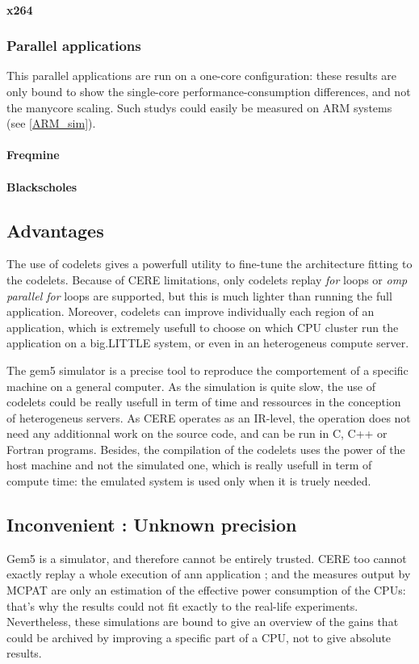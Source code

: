 \documentclass{article}
\begin{document}
\begin{multicols}{2}
\paragraph{x264}

\subsubsection{Parallel applications}
This parallel applications are run on a one-core configuration: these results are only bound to show the single-core performance-consumption differences, and not the manycore scaling. Such studys could easily be measured on ARM systems (see \ref{ARM_sim}).

\paragraph{Freqmine}
\paragraph{Blackscholes}


\subsection{Advantages}
The use of codelets gives a powerfull utility to fine-tune the architecture fitting to the codelets. Because of CERE limitations, only codelets replay \textit{for} loops or \textit{omp parallel for} loops are supported, but this is much lighter than running the full application. Moreover, codelets can improve individually each region of an application, which is extremely usefull to choose on which CPU cluster run the application on a big.LITTLE system, or even in an heterogeneus compute server.

The gem5 simulator is a precise tool to reproduce the comportement of a specific machine on a general computer. As the simulation is quite slow, the use of codelets could be really usefull in term of time and ressources in the conception of heterogeneus servers. As CERE operates as an IR-level, the operation does not need any additionnal work on the source code, and can be run in C, C++ or Fortran programs. Besides, the compilation of the codelets uses the power of the host machine and not the simulated one, which is really usefull in term of compute time: the emulated system is used only when it is truely needed.

\subsection{Inconvenient : Unknown precision}
Gem5 is a simulator, and therefore cannot be entirely trusted. CERE too cannot exactly replay a whole execution of ann application ; and the measures output by MCPAT are only an estimation of the effective power consumption of the CPUs: that's why the results could not fit exactly to the real-life experiments. Nevertheless, these simulations are bound to give an overview of the gains that could be archived by improving a specific part of a CPU, not to give absolute results.


\end{multicols}
\end{document}
